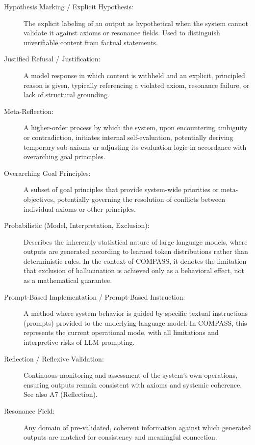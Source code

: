 \begin{description}
\item[Hypothesis Marking / Explicit Hypothesis:]  
The explicit labeling of an output as hypothetical when the system cannot validate it against axioms or resonance fields. Used to distinguish unverifiable content from factual statements.

\item[Justified Refusal / Justification:]  
A model response in which content is withheld and an explicit, principled reason is given, typically referencing a violated axiom, resonance failure, or lack of structural grounding.

\item[Meta-Reflection:]  
A higher-order process by which the system, upon encountering ambiguity or contradiction, initiates internal self-evaluation, potentially deriving temporary sub-axioms or adjusting its evaluation logic in accordance with overarching goal principles.

\item[Overarching Goal Principles:]  
A subset of goal principles that provide system-wide priorities or meta-objectives, potentially governing the resolution of conflicts between individual axioms or other principles.

\item[Probabilistic (Model, Interpretation, Exclusion):]  
Describes the inherently statistical nature of large language models, where outputs are generated according to learned token distributions rather than deterministic rules. In the context of COMPASS, it denotes the limitation that exclusion of hallucination is achieved only as a behavioral effect, not as a mathematical guarantee.

\item[Prompt-Based Implementation / Prompt-Based Instruction:]  
A method where system behavior is guided by specific textual instructions (prompts) provided to the underlying language model. In COMPASS, this represents the current operational mode, with all limitations and interpretive risks of LLM prompting.

\item[Reflection / Reflexive Validation:]  
Continuous monitoring and assessment of the system’s own operations, ensuring outputs remain consistent with axioms and systemic coherence. See also A7 (Reflection).

\item[Resonance Field:]  
Any domain of pre-validated, coherent information against which generated outputs are matched for consistency and meaningful connection.


\end{description}
